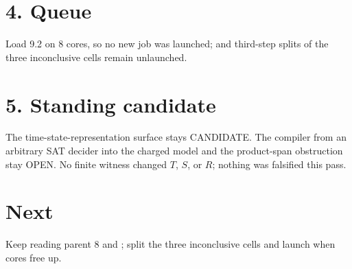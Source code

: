 \documentclass[11pt]{article}
\begin{document}
\section*{4. Queue}
Load 9.2 on 8 cores, so no new job was launched;  and third-step splits of the three inconclusive cells remain unlaunched.

\section*{5. Standing candidate}
The time-state-representation surface stays CANDIDATE. The compiler from an arbitrary SAT decider into the charged model and the product-span obstruction stay OPEN. No finite witness changed $T$, $S$, or $R$; nothing was falsified this pass.

\section*{Next}
Keep reading parent 8 and ; split the three inconclusive cells and launch  when cores free up.
\end{document}
